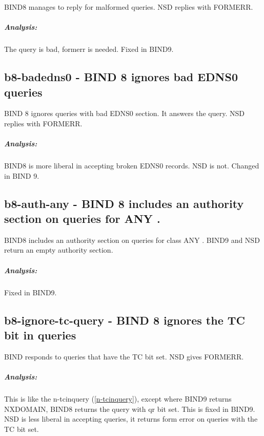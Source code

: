 \documentclass[twoside,titlepage,english]{nlnetlabs}
\begin{document}
BIND8 manages to reply for malformed queries. NSD replies with FORMERR.

\vspace{-8pt}\subparagraph{Analysis:}

The query is bad, formerr is needed. Fixed in BIND9.


\subsection{b8-badedns0 - BIND 8 ignores bad EDNS0 queries}
\label{b8-badedns0}

BIND 8 ignores queries with bad EDNS0 section. It answers the query.
NSD replies with FORMERR.

\vspace{-8pt}\subparagraph{Analysis:}

BIND8 is more liberal in accepting broken EDNS0 records. NSD is not.
Changed in BIND 9.


\subsection{b8-auth-any - BIND 8 includes an authority section on queries for ANY .}
\label{b8-auth-any}

BIND8 includes an authority section on queries for class ANY .
BIND9 and NSD return an empty authority section.

\vspace{-8pt}\subparagraph{Analysis:}

Fixed in BIND9.


\subsection{b8-ignore-tc-query - BIND 8 ignores the TC bit in queries}
\label{b8-ignore-tc-query}

BIND responds to queries that have the TC bit set. NSD gives FORMERR.

\vspace{-8pt}\subparagraph{Analysis:}

This is like the n-tcinquery (\ref{n-tcinquery}), except where BIND9 returns NXDOMAIN,
BIND8 returns the query with qr bit set. This is fixed in BIND9.
NSD is less liberal in accepting queries, it returns form error on queries with
the TC bit set.



\end{document}
